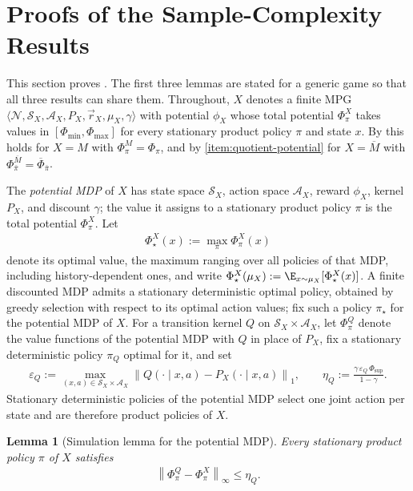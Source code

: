 \documentclass{article}
\theoremstyle{plain}
\newtheorem{lemma}[theorem]{Lemma}
\theoremstyle{definition}
\theoremstyle{remark}
\newcommand{\N}{\mathcal{N}}
\newcommand{\Ac}{\mathcal{A}}
\newcommand{\norm}[1]{\left\lVert#1\right\rVert}
\newcommand{\quotient}[1]{\overline{#1}}
\newcommand{\Potbar}{\overline{\Phi}}
\newcommand{\Phisup}{\Phi_{\mathrm{sup}}}
\begin{document}
\section{Proofs of the Sample-Complexity Results}
\label{app:proof-sample-complexity}

This section proves
.
The first three lemmas are stated for a generic game so that all three results
can share them. Throughout, $X$ denotes a finite MPG
$\langle\N,\mathcal S_X,\Ac_X,P_X,\vec r_X,\mu_X,\gamma\rangle$ with potential
$\phi_X$ whose total potential $\Phi^X_\pi$ takes values in
$[\Phi_{\min},\Phi_{\max}]$ for every stationary product policy $\pi$ and
state $x$. By  this holds for $X=M$ with
$\Phi^M_\pi=\Phi_\pi$, and by
\ref{item:quotient-potential} for $X=\quotient M$
with $\Phi^{\quotient M}_{\bar\pi}=\Potbar_{\bar\pi}$.

The \emph{potential MDP} of $X$ has state space $\mathcal S_X$, action space
$\Ac_X$, reward $\phi_X$, kernel $P_X$, and discount $\gamma$; the value it
assigns to a stationary product policy $\pi$ is the total potential
$\Phi^X_\pi$. Let
\begin{align*}
  \Phi^X_\star(x)
  :=
  \max_{\pi}\Phi^X_\pi(x)
\end{align*}
denote its optimal value, the maximum ranging over all policies of that MDP,
including history-dependent ones, and write
$\Phi^X_\star(\mu_X):=\E_{x\sim\mu_X}[\Phi^X_\star(x)]$. A finite discounted
MDP admits a stationary deterministic optimal policy, obtained by greedy
selection with respect to its optimal action values; fix such a policy
$\pi_\star$ for the potential MDP of $X$. For a transition kernel $Q$ on
$\mathcal S_X\times\Ac_X$, let $\Phi^Q_\pi$ denote the value functions of the
potential MDP with $Q$ in place of $P_X$, fix a stationary deterministic
policy $\pi_Q$ optimal for it, and set
\begin{align*}
  \varepsilon_Q
  :=
  \max_{(x,a)\in\mathcal S_X\times\Ac_X}
  \norm{Q(\cdot\mid x,a)-P_X(\cdot\mid x,a)}_1,
  \qquad
  \eta_Q
  :=
  \frac{\gamma\,\varepsilon_Q\,\Phisup}{1-\gamma}.
\end{align*}
Stationary deterministic policies of the potential MDP select one joint
action per state and are therefore product policies of $X$.

\begin{lemma}[Simulation lemma for the potential MDP]
\label{lemma:potential-simulation}
Every stationary product policy $\pi$ of $X$ satisfies
\begin{align*}
  \norm{\Phi^Q_\pi-\Phi^X_\pi}_\infty
  \le
  \eta_Q.
\end{align*}
\end{lemma}
\end{document}
